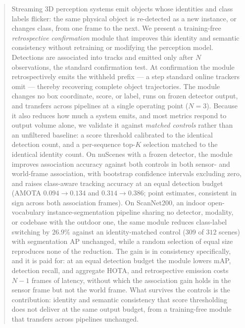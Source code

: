 \begin{abstract}
Streaming 3D perception systems emit objects whose identities and class labels
flicker: the same physical object is re-detected as a new instance, or changes
class, from one frame to the next. We present a training-free
\emph{retrospective confirmation} module that improves this identity and
semantic consistency without retraining or modifying the perception model.
Detections are associated into tracks and emitted only after $N$ observations,
the standard confirmation test. At confirmation the module retrospectively
emits the withheld prefix --- a step standard online trackers omit ---
thereby recovering complete object trajectories. The module changes no box coordinate,
score, or label, runs on frozen detector output, and transfers across
pipelines at a single operating point ($N{=}3$). Because it also reduces how
much a system emits, and most metrics respond to output volume alone, we
validate it against \emph{matched controls} rather than an unfiltered
baseline: a score threshold calibrated to the identical detection count, and a
per-sequence top-$K$ selection matched to the identical identity count. On
nuScenes with a frozen detector, the module improves association accuracy
against both controls in both sensor- and world-frame association, with
bootstrap confidence intervals excluding zero, and raises class-aware tracking
accuracy at an equal detection budget (AMOTA $0.094\!\to\!0.134$ and
$0.314\!\to\!0.386$; point estimates, consistent in sign across both
association frames). On ScanNet200,
an indoor open-vocabulary instance-segmentation pipeline sharing no detector,
modality, or codebase with the outdoor one, the same module reduces
class-label switching by $26.9\%$ against an identity-matched control ($309$
of $312$ scenes) with segmentation AP unchanged, while a random selection of
equal size reproduces none of the reduction. The gain is in consistency
specifically, and it is paid for: at an equal detection budget the module
lowers mAP, detection recall, and aggregate HOTA, and retrospective emission
costs $N{-}1$ frames of latency, without which the association gain holds in
the sensor frame but not the world frame. What survives the controls is the
contribution: identity and semantic consistency that score thresholding does
not deliver at the same output budget, from a training-free module that
transfers across pipelines unchanged.
\end{abstract}
